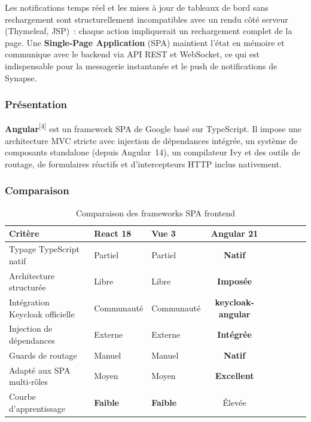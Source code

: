 Les notifications temps réel et les mises à jour de tableaux de bord sans rechargement sont structurellement incompatibles avec un rendu côté serveur (Thymeleaf, JSP)~: chaque action impliquerait un rechargement complet de la page. Une \textbf{Single-Page Application} (SPA) maintient l'état en mémoire et communique avec le backend via API REST et WebSocket, ce qui est indispensable pour la messagerie instantanée et le push de notifications de Synapse.

\subsubsection*{Présentation}

\textbf{Angular}\textsuperscript{[4]} est un framework SPA de Google basé sur TypeScript. Il impose
une architecture MVC stricte avec injection de dépendances intégrée, un système de
composants standalone (depuis Angular~14), un compilateur Ivy et des outils de
routage, de formulaires réactifs et d'intercepteurs HTTP inclus nativement.

\subsubsection*{Comparaison}

\begin{table}[H]
\centering
\caption{Comparaison des frameworks SPA frontend}
\label{tab:cmp_frontend}
\begin{tabularx}{\textwidth}{VlVCVCVCV}
\hline
\textbf{Critère} & \textbf{React 18} & \textbf{Vue 3} & \textbf{Angular 21} \\
\hline
Typage TypeScript natif       & Partiel  & Partiel  & \textbf{Natif} \\
\hline
Architecture structurée       & Libre    & Libre    & \textbf{Imposée} \\
\hline
Intégration Keycloak officielle & Communauté & Communauté & \textbf{keycloak-angular} \\
\hline
Injection de dépendances      & Externe  & Externe  & \textbf{Intégrée} \\
\hline
Guards de routage             & Manuel   & Manuel   & \textbf{Natif} \\
\hline
Adapté aux SPA multi-rôles   & Moyen    & Moyen    & \textbf{Excellent} \\
\hline
Courbe d'apprentissage        & \textbf{Faible} & \textbf{Faible} & Élevée \\
\hline
\end{tabularx}
\end{table}

